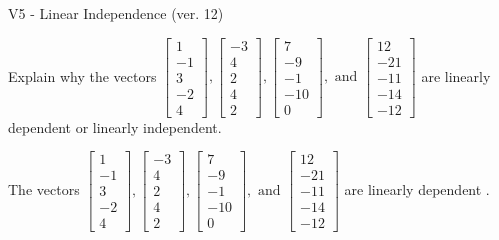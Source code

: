 \begin{exercise}
  \begin{exerciseTitle}V5 - Linear Independence (ver. 12)\end{exerciseTitle}
  \begin{exerciseStatement}
    Explain why the vectors \(\left[\begin{array}{r}
1 \\
-1 \\
3 \\
-2 \\
4
\end{array}\right] , \left[\begin{array}{r}
-3 \\
4 \\
2 \\
4 \\
2
\end{array}\right] , \left[\begin{array}{r}
7 \\
-9 \\
-1 \\
-10 \\
0
\end{array}\right] , \text{ and } \left[\begin{array}{r}
12 \\
-21 \\
-11 \\
-14 \\
-12
\end{array}\right]\) are linearly dependent or linearly independent.	


  \end{exerciseStatement}
  \begin{exerciseAnswer}
   The vectors \(\left[\begin{array}{r}
1 \\
-1 \\
3 \\
-2 \\
4
\end{array}\right] , \left[\begin{array}{r}
-3 \\
4 \\
2 \\
4 \\
2
\end{array}\right] , \left[\begin{array}{r}
7 \\
-9 \\
-1 \\
-10 \\
0
\end{array}\right] , \text{ and } \left[\begin{array}{r}
12 \\
-21 \\
-11 \\
-14 \\
-12
\end{array}\right]\) are 
  	 linearly dependent  .
  


  \end{exerciseAnswer}
\end{exercise}